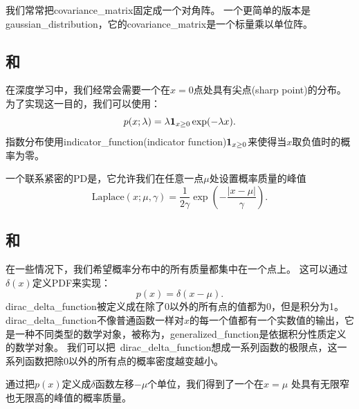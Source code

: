 
我们常常把\gls{covariance_matrix}固定成一个对角阵。
一个更简单的版本是\gls{gaussian_distribution}，它的\gls{covariance_matrix}是一个标量乘以单位阵。

\subsection{和}
\label{sec:exponential_and_laplace_distributions}

在深度学习中，我们经常会需要一个在$x=0$点处具有尖点(sharp point)的分布。
为了实现这一目的，我们可以使用：
\begin{equation}
p(x; \lambda) = \lambda \boldsymbol{1}_{x\ge 0} \exp(-\lambda x).
\end{equation}
指数分布使用\gls{indicator_function}(indicator function)$\boldsymbol{1}_{x\ge 0}$来使得当$x$取负值时的概率为零。

一个联系紧密的\gls{PD}是，它允许我们在任意一点$\mu$处设置概率质量的峰值
\begin{equation}
\label{eq:chap3_laplace}
\text{Laplace}(x; \mu, \gamma) = \frac{1}{2\gamma} \exp \left( -\frac{|x-\mu|}{\gamma}  \right).
\end{equation}

\subsection{和}
\label{sec:the_dirac_distribution_and_empirical_distribution}

在一些情况下，我们希望概率分布中的所有质量都集中在一个点上。
这可以通过 $\delta(x)$定义\gls{PDF}来实现：
\begin{equation}
p(x) = \delta(x-\mu).
\end{equation}
\gls{dirac_delta_function}被定义成在除了0以外的所有点的值都为0，但是积分为1。
\gls{dirac_delta_function}不像普通函数一样对$x$的每一个值都有一个实数值的输出，它是一种不同类型的数学对象，被称为，\gls{generalized_function}是依据积分性质定义的数学对象。
我们可以把~\gls{dirac_delta_function}想成一系列函数的极限点，这一系列函数把除0以外的所有点的概率密度越变越小。


通过把$p(x)$定义成$\delta$函数左移$-\mu$个单位，我们得到了一个在$x=\mu$ 处具有无限窄也无限高的峰值的概率质量。

